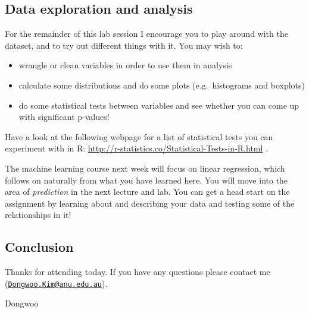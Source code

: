 \documentclass[]{article}
\providecommand{\tightlist}{%
  \setlength{\itemsep}{0pt}\setlength{\parskip}{0pt}}
\begin{document}
\hypertarget{data-exploration-and-analysis}{%
\subsection{Data exploration and
analysis}\label{data-exploration-and-analysis}}

For the remainder of this lab session I encourage you to play around
with the dataset, and to try out different things with it. You may wish
to:

\begin{itemize}
\tightlist
\item
  wrangle or clean variables in order to use them in analysis
\item
  calculate some distributions and do some plots (e.g.~histograms and
  boxplots)
\item
  do some statistical tests between variables and see whether you can
  come up with significant p-values!
\end{itemize}

Have a look at the following webpage for a list of statistical tests you
can experiment with in R:
\url{http://r-statistics.co/Statistical-Tests-in-R.html} .

The machine learning course next week will focus on linear regression,
which follows on naturally from what you have learned here. You will
move into the area of \emph{prediction} in the next lecture and lab. You
can get a head start on the assignment by learning about and describing
your data and testing some of the relationships in it!

\hypertarget{conclusion}{%
\subsection{Conclusion}\label{conclusion}}

Thanks for attending today. If you have any questions please contact me
(\href{mailto:Dongwoo.Kim@anu.edu.au}{\nolinkurl{Dongwoo.Kim@anu.edu.au}}).

Dongwoo
\end{document}
